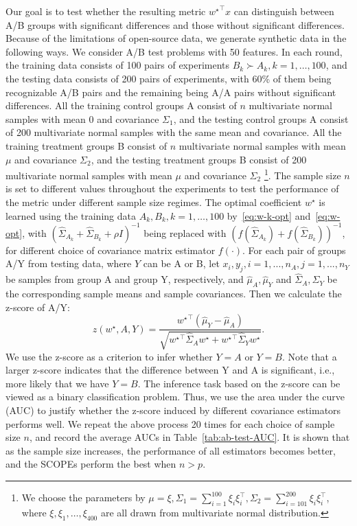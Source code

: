 \documentclass[11pt]{article}
\newcommand{\opt}{^\star}
\def\transpose{\top}
\newcommand{\wh}{\widehat}
\begin{document}
Our goal is to test whether the resulting metric ${w\opt}^\transpose x$ can distinguish between A/B groups with significant differences and those without significant differences.
Because of the limitations of open-source data, we generate synthetic data in the following ways. We consider A/B test problems with 50 features. In each round, the training data consists of 100 pairs of experiments $B_k\succ A_k, k=1,\ldots,100$, and the testing data consists of 200 pairs of experiments, with 60\% of them being recognizable A/B pairs and the remaining being A/A pairs without significant differences. All the training control groups A consist of $n$ multivariate normal samples with mean $0$ and covariance $\Sigma_1$, and the testing control groups A consist of 200 multivariate normal samples with the same mean and covariance. All the training treatment groups B consist of $n$ multivariate normal samples with mean $\mu$ and covariance $\Sigma_2$, and the testing treatment groups B consist of 200 multivariate normal samples with mean $\mu$ and covariance $\Sigma_2$
\footnote{We choose the parameters by $\mu=\xi, \Sigma_1=\sum_{i=1}^{100} \xi_i\xi_i^\transpose,\Sigma_2=\sum_{i=101}^{200} \xi_i\xi_i^\transpose$, where $\xi, \xi_1,\ldots,\xi_{400}$ are all drawn from multivariate normal distribution.}.
The sample size $n$ is set to different values throughout the experiments to test the performance of the metric under different sample size regimes. The optimal coefficient $w\opt$ is learned using the training data $A_k, B_k, k=1,\ldots,100$ by~\eqref{eq:w-k-opt} and~\eqref{eq:w-opt}, with $(\wh \Sigma_{A_k}+\wh\Sigma_{B_k}+ \rho I)^{-1}$ being replaced with $(f(\wh \Sigma_{A_k})+f(\wh\Sigma_{B_k}))^{-1}$, for different choice of covariance matrix estimator $f(\cdot)$. For each pair of groups A/Y from testing data, where $Y$ can be A or B, let $x_i, y_j, i=1,...,n_A, j=1,...,n_Y$ be samples from group A and group Y, respectively, and $\wh \mu_A, \wh \mu_Y$ and $\wh\Sigma_A, \wh\Sigma_Y$ be the corresponding sample means and sample covariances. Then we calculate the z-score of A/Y:
\[
    z(w\opt, A, Y) = \frac{{w\opt}^\transpose(\wh\mu_Y-\wh\mu_A)}{\sqrt{{w\opt}^\transpose \wh\Sigma_A w\opt + {w\opt}^\transpose \wh\Sigma_Y w\opt}}. 
\]
We use the z-score as a criterion to infer whether $Y=A$ or $Y=B$. Note that a larger z-score indicates that the difference between Y and A is significant, i.e., more likely that we have $Y=B$. The inference task based on the z-score can be viewed as a binary classification problem. Thus, we use the area under the curve (AUC) to justify whether the z-score induced by different covariance estimators performs well. We repeat the above process 20 times for each choice of sample size $n$, and record the average AUCs in Table~\ref{tab:ab-test-AUC}. It is shown that as the sample size increases, the performance of all estimators becomes better, and the SCOPEs perform the best when $n > p$.
\end{document}
